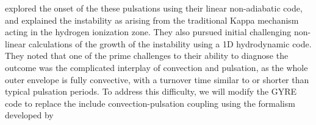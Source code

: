 \citet{1997AampA...327..224H} explored the onset of the these pulsations using
their linear non-adiabatic code, and explained the instability 
as arising from the traditional Kappa mechanism acting in the
hydrogen ionization zone. They also pursued initial challenging
non-linear calculations of the growth of the instability using a 1D 
hydrodynamic code. They noted that one of the prime challenges to
their ability to diagnose the outcome was the complicated interplay of
convection and pulsation, as the whole outer envelope is fully
convective, with a turnover time similar to or shorter than typical pulsation periods. To address this difficulty, we will modify the GYRE code to replace the include convection-pulsation coupling using the formalism developed by \citet{Houdek:2010}